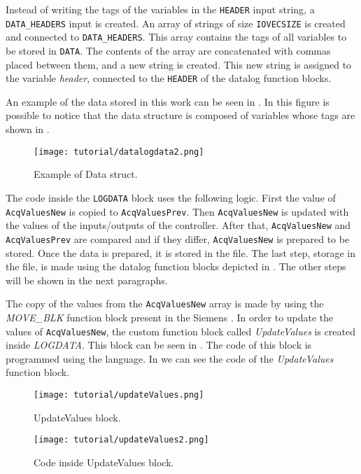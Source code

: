Instead of writing the tags of the variables in the \verb|HEADER| input string, a \verb|DATA_HEADERS| input is created.
An array of strings of size \verb|IOVECSIZE| is created and connected to \verb|DATA_HEADERS|. This array contains the tags of all variables to be
stored in \verb|DATA|. The contents of the array are concatenated with
commas placed between them, and a new string is created. This new string is assigned to the variable
\emph{header}, connected to the \verb|HEADER| of the datalog function blocks. 

An example of the data stored in this work can be seen in
. In this figure is possible to notice that the data structure is composed of variables whose tags are shown
in . 
\begin{figure}[H] \centering
 \texttt{[image: tutorial/datalogdata2.png]}
  \caption{Example of Data struct.}
  \label{fig:exampleDataStruct}
\end{figure}
The code inside the \verb|LOGDATA| block uses the following logic.
First the value of \verb|AcqValuesNew| is copied to \verb|AcqValuesPrev|. Then \verb|AcqValuesNew| is updated with the values of the inputs\slash outputs of the controller. After that, \verb|AcqValuesNew| and \verb|AcqValuesPrev| are compared and if they differ, \verb|AcqValuesNew| is prepared to be stored.
Once the data is prepared, it is stored in the file. 
The last step, storage in the file, is made using the datalog function blocks depicted in
. The other steps  will be shown
in the next paragraphs.

The copy of the values from the \verb|AcqValuesNew| array is made by using the \mbox{\emph{MOVE\_BLK}} function block present in the Siemens \PLC. 
In order to update the values of \verb|AcqValuesNew|, the custom function block called
\emph{UpdateValues} is created inside \emph{LOGDATA}. This block can be seen in
. The code of this block is programmed using the \SCL{} language. In  we
can see the code of the \mbox{\emph{UpdateValues}} function block.

\begin{figure}[H] \centering
 \texttt{[image: tutorial/updateValues.png]}
  \caption{UpdateValues block.}
  \label{fig:updateValuesBlock}
\end{figure}

\begin{figure}[H] \centering
 \texttt{[image: tutorial/updateValues2.png]}
  \caption{Code inside UpdateValues block.}
  \label{fig:updateValuesBlockCode}
\end{figure}

